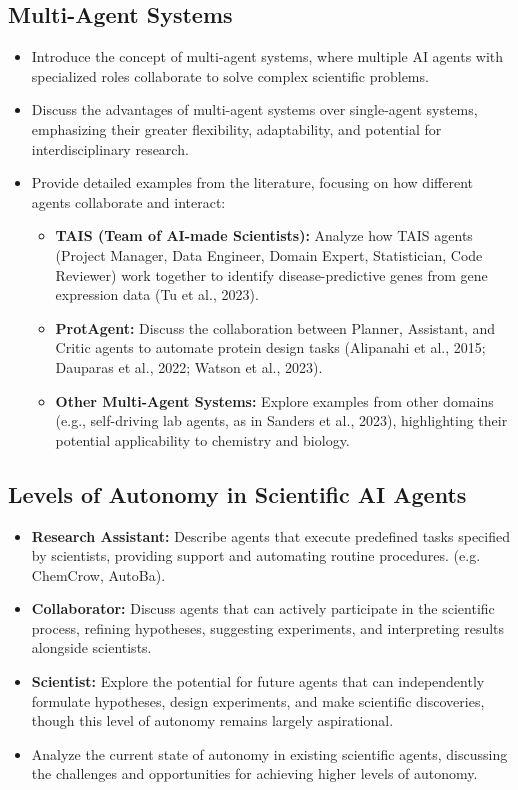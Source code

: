 \documentclass{article}
\begin{document}
\subsection{Multi-Agent Systems}
\begin{itemize}
    \item Introduce the concept of multi-agent systems, where multiple AI agents with specialized roles collaborate to solve complex scientific problems.
    \item Discuss the advantages of multi-agent systems over single-agent systems, emphasizing their greater flexibility, adaptability, and potential for interdisciplinary research.
    \item Provide detailed examples from the literature, focusing on how different agents collaborate and interact:
    \begin{itemize}
        \item \textbf{TAIS (Team of AI-made Scientists):} Analyze how TAIS agents (Project Manager, Data Engineer, Domain Expert, Statistician, Code Reviewer) work together to identify disease-predictive genes from gene expression data (Tu et al., 2023).
        \item \textbf{ProtAgent:} Discuss the collaboration between Planner, Assistant, and Critic agents to automate protein design tasks (Alipanahi et al., 2015; Dauparas et al., 2022; Watson et al., 2023).
        \item \textbf{Other Multi-Agent Systems:} Explore examples from other domains (e.g., self-driving lab agents, as in Sanders et al., 2023), highlighting their potential applicability to chemistry and biology.
    \end{itemize}
\end{itemize}

\subsection{Levels of Autonomy in Scientific AI Agents}
\begin{itemize}
    \item \textbf{Research Assistant:} Describe agents that execute predefined tasks specified by scientists, providing support and automating routine procedures. (e.g. ChemCrow, AutoBa).
    \item \textbf{Collaborator:} Discuss agents that can actively participate in the scientific process, refining hypotheses, suggesting experiments, and interpreting results alongside scientists.
    \item \textbf{Scientist:} Explore the potential for future agents that can independently formulate hypotheses, design experiments, and make scientific discoveries, though this level of autonomy remains largely aspirational.
    \item Analyze the current state of autonomy in existing scientific agents, discussing the challenges and opportunities for achieving higher levels of autonomy.
\end{itemize}
\end{document}
